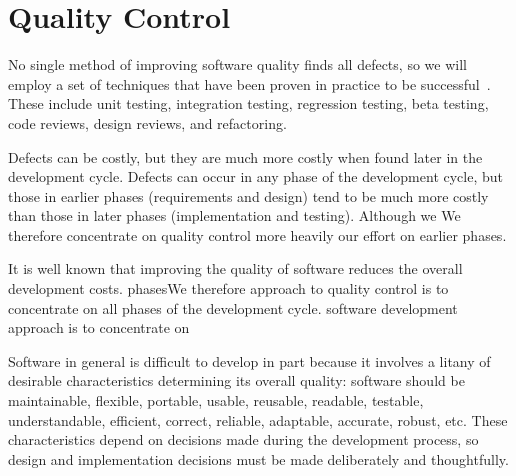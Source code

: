 \documentclass{article}
\begin{document}
\section{Quality Control} \label{s:testing}

No single method of improving software quality finds all defects, so
we will employ a set of techniques that have been proven in practice
to be successful~\cite{Mc04}.  These include unit testing, integration
testing, regression testing, beta testing, code reviews, design reviews, and
refactoring.

Defects can be costly, but they are much more costly when found later
in the development cycle.  Defects can occur in any phase of the
development cycle, but those in earlier phases (requirements and
design) tend to be much more costly than those in later phases
(implementation and testing).  Although we We therefore concentrate on quality
control more heavily our effort on earlier phases.

It is well known that improving the quality of software reduces the overall
development costs. 
 phasesWe therefore
approach to quality control is to concentrate on all phases of the
development cycle.  software development approach is to 
concentrate on 

Software in general is difficult to develop in part because it
involves a litany of desirable characteristics determining its overall
quality: software should be maintainable, flexible, portable,
usable, reusable, readable, testable, understandable, efficient, correct,
reliable, adaptable, accurate, robust, etc.  These characteristics
depend on decisions made during the development process, so design
and implementation decisions must be made deliberately and thoughtfully.
\end{document}
